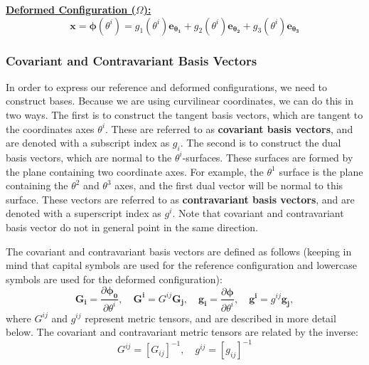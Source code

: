 \documentclass[]{spie}  %
\begin{document}
\underline{\textbf{Deformed Configuration ($\Omega$):}}
\begin{equation}
\bm{x} = \bm{\phi}(\theta^i) = g_1(\theta^i)\bm{{e_{\theta_1}}} + g_2(\theta^i)\bm{{e_{\theta_2}}} + g_3(\theta^i)\bm{{e_{\theta_3}}}
\end{equation}

\subsubsection{Covariant and Contravariant Basis Vectors}
In order to express our reference and deformed configurations, we need to construct bases. Because we are using curvilinear coordinates, we can do this in two ways. The first is to construct the tangent basis vectors, which are tangent to the coordinates axes $\theta^i$. These are referred to as \textbf{covariant basis vectors}, and are denoted with a subscript index as $g_i$. The second is to construct the dual basis vectors, which are normal to the $\theta^i$-surfaces. These surfaces are formed by the plane containing two coordinate axes. For example, the $\theta^1$ surface is the plane containing the $\theta^2$ and $\theta^3$ axes, and the first dual vector will be normal to this surface. These vectors are referred to as \textbf{contravariant basis vectors}, and are denoted with a superscript index as $g^i$. Note that covariant and contravariant basis vector do not in general point in the same direction. 

The covariant and contravariant basis vectors are defined as follows (keeping in mind that capital symbols are used for the reference configuration and lowercase symbols are used for the deformed configuration):
\begin{equation}
\bm{G_i} = \frac{\partial \bm{\phi_0}}{\partial \theta^i}, \quad \bm{G^i} = G^{ij}\bm{G_j}, \quad \bm{g_i} = \frac{\partial \bm{\phi}}{\partial \theta^i}, \quad \bm{g^i} = g^{ij}\bm{g_j},
\end{equation}
where $G^{ij}$ and $g^{ij}$ represent metric tensors, and are described in more detail below. The covariant and contravariant metric tensors are related by the inverse:
\begin{equation}
G^{ij} = [G_{ij}]^{-1}, \quad g^{ij} = [g_{ij}]^{-1}
\end{equation}
\end{document}
